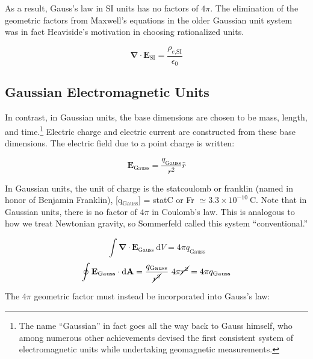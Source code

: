 \documentclass[notoc]{tufte-handout}
\renewcommand{\vec}[1]{\mathbf{#1}}
\newcommand{\del}{\vec{\nabla}}
\begin{document}
As a result, Gauss's law in SI units has no factors of $4 \pi$. The elimination of the geometric factors from Maxwell's equations in the older Gaussian unit system was in fact Heaviside's motivation in choosing rationalized units.

\begin{equation}
\del \cdot \vec{E}_{\text{SI}} = \frac{\rho_{e\text{,SI}}}{\epsilon_0}
\end{equation}

\subsection {Gaussian Electromagnetic Units}

In contrast, in Gaussian units, the base dimensions are chosen to be mass, length, and time.\footnote {The name ``Gaussian'' in fact goes all the way back to Gauss himself, who among numerous other achievements devised the first consistent system of electromagnetic units while undertaking geomagnetic measurements.} Electric charge and electric current are constructed from these base dimensions.  The electric field due to a point charge is written:

\begin{equation}
\vec{E}_{\text{Gauss}}  = \frac{q_{\text{Gauss}} }{r^2} \hat{r}
\end{equation}

In Gaussian units, the unit of charge is the statcoulomb or franklin (named in honor of Benjamin Franklin), [q$_{\text{Gauss}}$] = statC or Fr $\simeq 3.3\times 10^{-10}~\text{C}$. Note that in Gaussian units, there is no factor of $4\pi$ in Coulomb's law. This is analogous to how we treat Newtonian gravity, so Sommerfeld called this system ``conventional.''

\begin{equation}
\int \del \cdot \vec{E}_{\text{Gauss}}~\mathrm{d}V = 4\pi q_{\text{Gauss}}
\end{equation}
\begin{equation}
\oint \vec{E}_{\text{Gauss}} \cdot \mathrm{d}\vec{A} =  \frac{q_{\text{Gauss}}}{\cancel{r^2}}~4\pi\cancel{r^2} = 4\pi q_{\text{Gauss}}
\end{equation}


The $4\pi$ geometric factor must instead be incorporated into Gauss's law:
\end{document}
